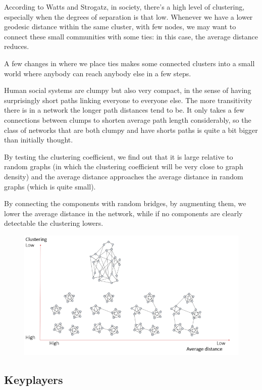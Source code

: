 \documentclass[
  notitlepage,
  onecolumn,
  openany]{book}
\begin{document}
According to Watts and Strogatz, in society, there's a high level of clustering, especially when the degrees of separation is that low. Whenever we have a lower geodesic distance within the same cluster, with few nodes, we may want to connect these small communities with some ties: in this case, the average distance reduces.

A few changes in where we place ties makes some connected clusters into a small world where anybody can reach anybody else in a few steps.

Human social systems are clumpy but also very compact, in the sense of having surprisingly short paths
linking everyone to everyone else. The more transitivity there is in a network the longer path distances tend to be. It only takes a few connections between clumps to shorten average path length considerably, so the class of networks that are both clumpy and have shorts paths is quite a bit bigger than initially thought.

By testing the clustering coefficient, we find out that it is large relative to random graphs (in which the clustering coefficient will be very close to graph density) and the average distance approaches the average distance in random graphs (which is quite small).

By connecting the components with random bridges, by augmenting them, we lower the average distance in the network, while if no components are clearly detectable the clustering lowers.

\begin{figure}[h!]

{\centering \includegraphics[width=0.6\linewidth]{images/07-Triads and structural holes/Untitled 4} 

}

\end{figure}

\hypertarget{keyplayers}{%
\subsection{Keyplayers}\label{keyplayers}}
\end{document}
